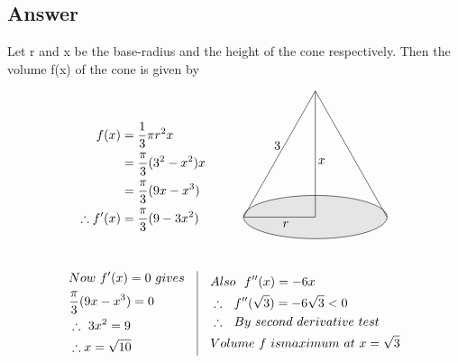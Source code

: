 \documentclass[17pt]{extarticle}
\begin{document}
\begin{fleqn}

\subsection*{Answer}
Let  r  and x  be the base-radius and the height of the cone respectively. Then the volume f(x) of the cone is given by

\begin{equation} \nonumber
\begin{alignedat}{4}
f(x) &= \frac{1}{3}\pi r^2x\\
&= \frac{\pi}{3}(3^2-x^2)x\\
&= \frac{\pi}{3}(9x - x^3)\\
\therefore f'(x) &=  \frac{\pi}{3}(9 - 3x^2)\\
\end{alignedat}
\quad\quad\quad
\begin{alignedat}{4}
\begin{tikzpicture}
\filldraw[fill=gray!20](0,0) ellipse (2cm and 0.6cm);
\draw (0,0) -- node[below] {\ \ \ $x$}(0,3.5);
\draw (0,0)  -- node[below] {\ \ \ $r$} (-2,0);
\draw  (-2,0) --node[above] {3\ \ }(0,3.5);
\draw  (2,0) -- (0,3.5);
\end{tikzpicture}\\\\
\end{alignedat}
\end{equation}
\begin{equation} \nonumber
\begin{alignedat}{4}
& Now\ f'(x) = 0\ gives\\
& \frac{\pi}{3}(9x - x^3)=0\\
& \therefore \ 3x^2=9\\
& \therefore x = \sqrt{10}
\end{alignedat}
\quad
\vrule
\quad
\begin{alignedat}{4}
& Also\ \ f''(x) =-6x\\
& \therefore\ \ f''(\sqrt{3})=-6\sqrt{3}<0\\
& \therefore \ \ By\ second\ derivative\ test\\
& Volume \ f\ is maximum\ at\ x=\sqrt{3}
\end{alignedat}
\end{equation}


\end{fleqn}
\end{document}
